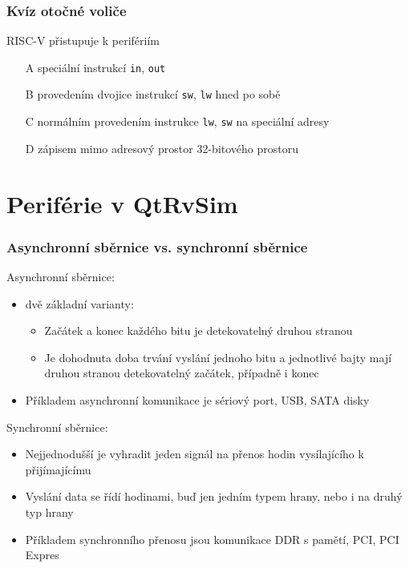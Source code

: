 \documentclass{beamer}
\begin{document}
\begin{frame}
\frametitle{Kvíz otočné voliče}

RISC-V přistupuje k perifériím
\begin{itemize}
\item[A] speciální instrukcí \texttt{in}, \texttt{out}
\item[B] provedením dvojice instrukcí \texttt{sw}, \texttt{lw} hned po sobě
\item[C] normálním provedením instrukce \texttt{lw}, \texttt{sw} na speciální adresy
\item[D] zápisem mimo adresový prostor 32-bitového prostoru
\end{itemize}
\end{frame}


\section{Periférie v QtRvSim}


\begin{frame}
\frametitle{Asynchronní sběrnice vs. synchronní sběrnice}

Asynchronní sběrnice:
\begin{itemize}
\item  dvě základní varianty:
\begin{itemize}
\item Začátek a konec každého bitu je detekovatelný druhou stranou
\item Je dohodnuta doba trvání vyslání jednoho bitu a jednotlivé bajty mají druhou stranou detekovatelný začátek, případně i konec
\end{itemize}
\item Příkladem asynchronní komunikace je sériový port, USB, SATA disky
\end{itemize}


Synchronní sběrnice:
\begin{itemize}
\item Nejjednodušší je vyhradit jeden signál na přenos hodin vysílajícího k přijímajícímu
\item Vyslání data se řídí hodinami, buď jen jedním typem hrany, nebo i na druhý typ hrany
\item Příkladem synchronního přenosu jsou komunikace DDR s pamětí, PCI, PCI Expres
\end{itemize}
\end{frame}
\end{document}
